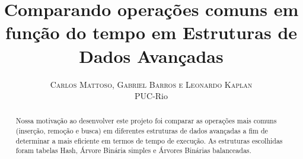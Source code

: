 \documentclass[twoside]{article}
\title{\vspace{-15mm}\fontsize{24pt}{10pt}\selectfont\textbf{Comparando operações comuns em função do tempo em Estruturas de Dados Avançadas}} %
\author{
\large
\textsc{Carlos Mattoso, Gabriel Barros e Leonardo Kaplan
}\\[2mm] %
\normalsize PUC-Rio \\ %
}
\date{}
\begin{document}
\maketitle %

\thispagestyle{fancy} %


\begin{abstract}

\noindent 
Nossa motivação ao desenvolver este projeto foi comparar as operações mais comuns (inserção, remoção e busca) em diferentes estruturas de dados avançadas a fim de determinar a mais eficiente em termos de tempo de execução.
As estruturas escolhidas foram tabelas Hash, Árvore Binária simples e Árvores Binárias balanceadas. 

\end{abstract}

\end{document}

